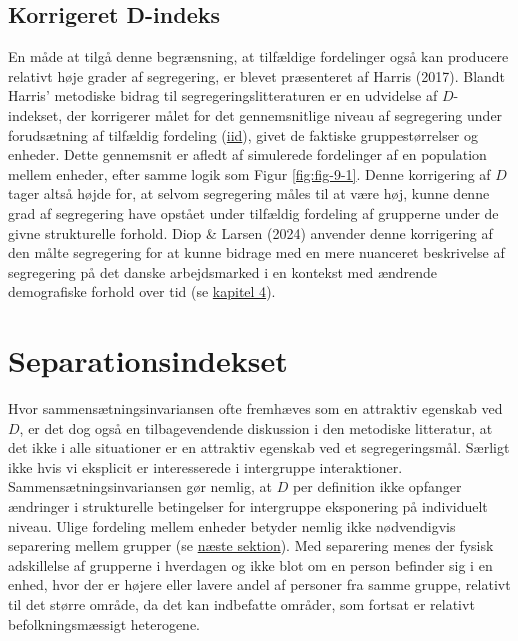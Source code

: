 \documentclass[
]{book}
\begin{document}
\subsection{Korrigeret D-indeks}\label{korrigeret-d-indeks}

En måde at tilgå denne begrænsning, at tilfældige fordelinger også kan producere relativt høje grader af segregering, er blevet præsenteret af Harris (2017). Blandt Harris' metodiske bidrag til segregeringslitteraturen er en udvidelse af \(D\)-indekset, der korrigerer målet for det gennemsnitlige niveau af segregering under forudsætning af tilfældig fordeling (\href{https://en.wikipedia.org/wiki/Independent_and_identically_distributed_random_variables}{iid}), givet de faktiske gruppestørrelser og enheder. Dette gennemsnit er afledt af simulerede fordelinger af en population mellem enheder, efter samme logik som Figur \ref{fig:fig-9-1}. Denne korrigering af \(D\) tager altså højde for, at selvom segregering måles til at være høj, kunne denne grad af segregering have opstået under tilfældig fordeling af grupperne under de givne strukturelle forhold. Diop \& Larsen (2024) anvender denne korrigering af den målte segregering for at kunne bidrage med en mere nuanceret beskrivelse af segregering på det danske arbejdsmarked i en kontekst med ændrende demografiske forhold over tid (se \hyperref[kap4]{kapitel 4}).

\section{Separationsindekset}\label{separationsindekset}

Hvor sammensætningsinvariansen ofte fremhæves som en attraktiv egenskab ved \(D\), er det dog også en tilbagevendende diskussion i den metodiske litteratur, at det ikke i alle situationer er en attraktiv egenskab ved et segregeringsmål. Særligt ikke hvis vi eksplicit er interesserede i intergruppe interaktioner. Sammensætningsinvariansen gør nemlig, at \(D\) per definition ikke opfanger ændringer i strukturelle betingelser for intergruppe eksponering på individuelt niveau. Ulige fordeling mellem enheder betyder nemlig ikke nødvendigvis separering mellem grupper (se \hyperref[forskel]{næste sektion}). Med separering menes der fysisk adskillelse af grupperne i hverdagen og ikke blot om en person befinder sig i en enhed, hvor der er højere eller lavere andel af personer fra samme gruppe, relativt til det større område, da det kan indbefatte områder, som fortsat er relativt befolkningsmæssigt heterogene.
\end{document}
